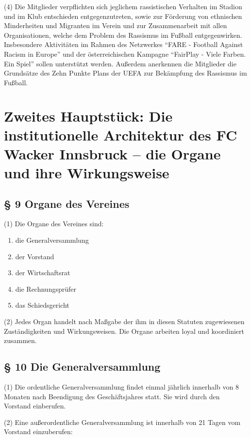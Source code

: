 \documentclass[10pt,a4paper]{article}
\begin{document}
(4)
Die Mitglieder verpflichten sich jeglichem rassistischen Verhalten im Stadion und im Klub entschieden entgegenzutreten, sowie zur Förderung von ethnischen Minderheiten und Migranten im Verein und zur Zusammenarbeit mit allen Organisationen, welche dem Problem des Rassismus im Fußball entgegenwirken.
Insbesondere Aktivitäten im Rahmen des Netzwerkes "`FARE - Football Against Racism in Europe"' und der österreichischen Kampagne "`FairPlay - Viele Farben. Ein Spiel"' sollen unterstützt werden.
Außerdem anerkennen die Mitglieder die Grundsätze des Zehn Punkte Plans der UEFA zur Bekämpfung des Rassismus im Fußball.

\clearpage

\section{Zweites Hauptstück: Die institutionelle Architektur des FC Wacker Innsbruck – die Organe und ihre Wirkungsweise}

\subsection{§ 9
Organe des Vereines}
(1)
Die Organe des Vereines sind:

\begin{enumerate}[label=\alph*)]
\item
die Generalversammlung
\item
der Vorstand
\item
der Wirtschaftsrat
\item
die Rechnungsprüfer
\item
das Schiedsgericht
\end{enumerate}

(2)
Jedes Organ handelt nach Maßgabe der ihm in diesen Statuten zugewiesenen Zuständigkeiten und Wirkungsweisen.
Die Organe arbeiten loyal und koordiniert zusammen.

\subsection{§ 10
Die Generalversammlung}

(1)
Die ordentliche Generalversammlung findet einmal jährlich innerhalb von 8 Monaten nach Beendigung des Geschäftsjahres statt.
Sie wird durch den Vorstand einberufen.

(2)
Eine außerordentliche Generalversammlung ist innerhalb von 21 Tagen vom Vorstand einzuberufen:
\end{document}
